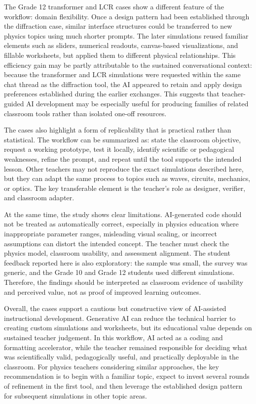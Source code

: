 \documentclass{iopjournal}
\begin{document}
The Grade 12 transformer and LCR cases show a different feature of the workflow: domain flexibility. Once a design pattern had been established through the diffraction case, similar interface structures could be transferred to new physics topics using much shorter prompts. The later simulations reused familiar elements such as sliders, numerical readouts, canvas-based visualizations, and fillable worksheets, but applied them to different physical relationships. This efficiency gain may be partly attributable to the sustained conversational context: because the transformer and LCR simulations were requested within the same chat thread as the diffraction tool, the AI appeared to retain and apply design preferences established during the earlier exchanges. This suggests that teacher-guided AI development may be especially useful for producing families of related classroom tools rather than isolated one-off resources.

The cases also highlight a form of replicability that is practical rather than statistical. The workflow can be summarized as: state the classroom objective, request a working prototype, test it locally, identify scientific or pedagogical weaknesses, refine the prompt, and repeat until the tool supports the intended lesson. Other teachers may not reproduce the exact simulations described here, but they can adapt the same process to topics such as waves, circuits, mechanics, or optics. The key transferable element is the teacher's role as designer, verifier, and classroom adapter.

At the same time, the study shows clear limitations. AI-generated code should not be treated as automatically correct, especially in physics education where inappropriate parameter ranges, misleading visual scaling, or incorrect assumptions can distort the intended concept. The teacher must check the physics model, classroom usability, and assessment alignment. The student feedback reported here is also exploratory: the sample was small, the survey was generic, and the Grade 10 and Grade 12 students used different simulations. Therefore, the findings should be interpreted as classroom evidence of usability and perceived value, not as proof of improved learning outcomes.

Overall, the cases support a cautious but constructive view of AI-assisted instructional development. Generative AI can reduce the technical barrier to creating custom simulations and worksheets, but its educational value depends on sustained teacher judgement. In this workflow, AI acted as a coding and formatting accelerator, while the teacher remained responsible for deciding what was scientifically valid, pedagogically useful, and practically deployable in the classroom. For physics teachers considering similar approaches, the key recommendation is to begin with a familiar topic, expect to invest several rounds of refinement in the first tool, and then leverage the established design pattern for subsequent simulations in other topic areas.
\end{document}
